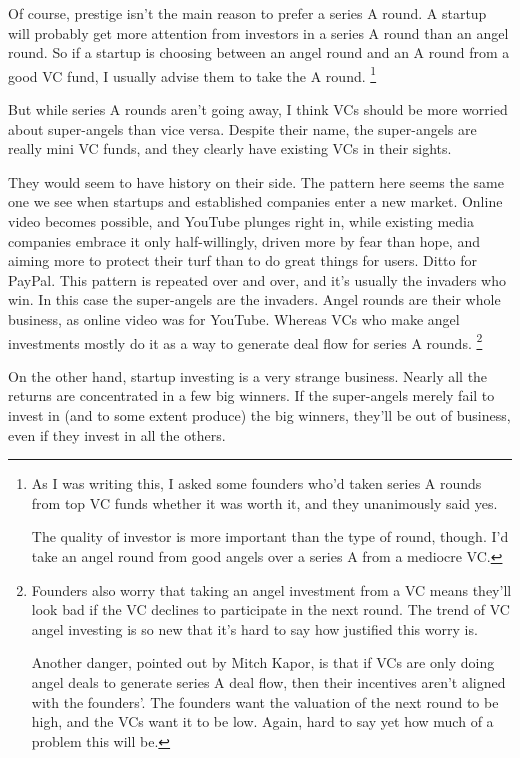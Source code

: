 Of course, prestige isn't the main reason to prefer a series A round. A
startup will probably get more attention from investors in a series A
round than an angel round. So if a startup is choosing between an angel
round and an A round from a good VC fund, I usually advise them to take
the A round. \footnote{As I was writing this, I asked some founders who'd taken series
A rounds from top VC funds whether it was worth it, and they unanimously
said yes.

The quality of investor is more important than the type of round,
though. I'd take an angel round from good angels over a series A from a
mediocre VC.}

But while series A rounds aren't going away, I think VCs should be more
worried about super-angels than vice versa. Despite their name, the
super-angels are really mini VC funds, and they clearly have existing
VCs in their sights.

They would seem to have history on their side. The pattern here seems
the same one we see when startups and established companies enter a new
market. Online video becomes possible, and YouTube plunges right in,
while existing media companies embrace it only half-willingly, driven
more by fear than hope, and aiming more to protect their turf than to do
great things for users. Ditto for PayPal. This pattern is repeated over
and over, and it's usually the invaders who win. In this case the
super-angels are the invaders. Angel rounds are their whole business, as
online video was for YouTube. Whereas VCs who make angel investments
mostly do it as a way to generate deal flow for series A rounds.
\footnote{Founders also worry that taking an angel investment from a VC
means they'll look bad if the VC declines to participate in the next
round. The trend of VC angel investing is so new that it's hard to say
how justified this worry is.

Another danger, pointed out by Mitch Kapor, is that if VCs are only
doing angel deals to generate series A deal flow, then their incentives
aren't aligned with the founders'. The founders want the valuation of
the next round to be high, and the VCs want it to be low. Again, hard to
say yet how much of a problem this will be.}

On the other hand, startup investing is a very strange business. Nearly
all the returns are concentrated in a few big winners. If the
super-angels merely fail to invest in (and to some extent produce) the
big winners, they'll be out of business, even if they invest in all the
others.


